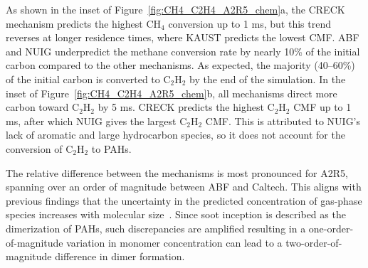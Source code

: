 As shown in the inset of Figure~\ref{fig:CH4_C2H4_A2R5_chem}a, the CRECK mechanism predicts the highest $\mathrm{CH_4}$ conversion up to 1 ms, but this trend reverses at longer residence times, where KAUST predicts the lowest CMF. ABF and NUIG underpredict the methane conversion rate by nearly 10\% of the initial carbon compared to the other mechanisms. As expected, the majority (40–60\%) of the initial carbon is converted to $\mathrm{C_2H_2}$ by the end of the simulation. In the inset of Figure~\ref{fig:CH4_C2H4_A2R5_chem}b, all mechanisms direct more carbon toward $\mathrm{C_2H_2}$ by 5 ms. CRECK predicts the highest $\mathrm{C_2H_2}$ CMF up to 1 ms, after which NUIG gives the largest $\mathrm{C_2H_2}$ CMF. This is attributed to NUIG’s lack of aromatic and large hydrocarbon species, so it does not account for the conversion of $\mathrm{C_2H_2}$ to PAHs.

The relative difference between the mechanisms is most pronounced for A2R5, spanning over an order of magnitude between ABF and Caltech. This aligns with previous findings that the uncertainty in the predicted concentration of gas-phase species increases with molecular size~\cite{wang2023systematic}. Since soot inception is described as the dimerization of PAHs, such discrepancies are amplified resulting in a one-order-of-magnitude variation in monomer concentration can lead to a two-order-of-magnitude difference in dimer formation.
 
